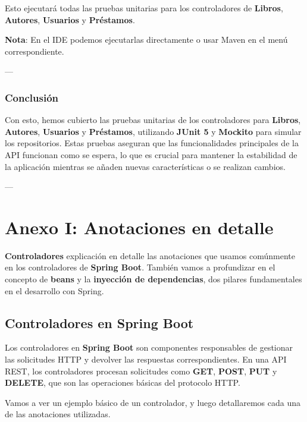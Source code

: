 \documentclass[11pt]{article}
\begin{document}
Esto ejecutará todas las pruebas unitarias para los controladores de \textbf{\textbf{Libros}}, \textbf{\textbf{Autores}}, \textbf{\textbf{Usuarios}} y \textbf{\textbf{Préstamos}}.

\begin{MDFRAMED}
\textbf{Nota}:
En el IDE podemos ejecutarlas directamente o usar Maven en el menú correspondiente.
\end{MDFRAMED}
---

\subsubsection{Conclusión}
\label{sec:org3a1b0cf}

Con esto, hemos cubierto las pruebas unitarias de los controladores para \textbf{\textbf{Libros}}, \textbf{\textbf{Autores}}, \textbf{\textbf{Usuarios}} y \textbf{\textbf{Préstamos}}, utilizando \textbf{\textbf{JUnit 5}} y \textbf{\textbf{Mockito}} para simular los repositorios. Estas pruebas aseguran que las funcionalidades principales de la API funcionan como se espera, lo que es crucial para mantener la estabilidad de la aplicación mientras se añaden nuevas características o se realizan cambios.


---


\section{Anexo I: Anotaciones en detalle}
\label{sec:org2b56ebd}

\textbf{\textbf{Controladores}} explicación en detalle las anotaciones que usamos comúnmente en los controladores de \textbf{\textbf{Spring Boot}}.
También vamos a profundizar en el concepto de \textbf{\textbf{beans}} y la \textbf{\textbf{inyección de dependencias}}, dos pilares fundamentales en el desarrollo con Spring.

\subsection{Controladores en Spring Boot}
\label{sec:org937cbbe}
Los controladores en \textbf{\textbf{Spring Boot}} son componentes responsables de gestionar las solicitudes HTTP y devolver las respuestas correspondientes. En una API REST, los controladores procesan solicitudes como \textbf{\textbf{GET}}, \textbf{\textbf{POST}}, \textbf{\textbf{PUT}} y \textbf{\textbf{DELETE}}, que son las operaciones básicas del protocolo HTTP.

Vamos a ver un ejemplo básico de un controlador, y luego detallaremos cada una de las anotaciones utilizadas.
\end{document}
